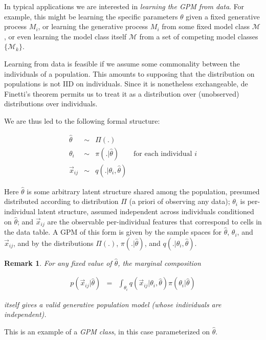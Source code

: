 \documentclass[10pt,letterpaper]{article}
\newtheorem{remark}{Remark}[section]
\newcommand{\set}[1]{\{#1\}}
\begin{document}
In typical applications we are interested in \textit{learning
the GPM from data}. For example, this might be learning the specific
parameters $\theta$ given a fixed generative process $M_i$, or learning the
generative process $M_i$ from some fixed model class $\mathcal{M}$, or even
learning the model class itself $\mathcal{M}$ from a set of competing model
classes $\set{\mathcal{M}_k}$.

Learning from data is feasible if we assume some commonality between
the individuals of a population.  This amounts to supposing that the
distribution on populations is not IID on individuals.  Since it
is nonetheless exchangeable, de Finetti's theorem 
permits us to treat it as a distribution over (unobserved) distributions
over individuals.

We are thus led to the following formal structure:

\begin{eqnarray*}
\hat{\theta} & \sim & \Pi(.) \\
\theta_i & \sim & \pi(.|\hat\theta) \qquad \textrm{for each individual $i$} \\
\vec{x}_{ij} & \sim & q(.|\theta_i, \hat\theta)
\end{eqnarray*}

Here $\hat\theta$ is some arbitrary latent structure shared among the
population, presumed distributed according to distribution $\Pi$ (a
priori of observing any data); $\theta_i$ is per-individual latent
structure, assumed independent across individuals conditioned on
$\hat\theta$; and $\vec{x}_{ij}$ are the observable per-individual
features that correspond to cells in the data table.  A GPM of this form is given by the
sample spaces for $\hat\theta$, $\theta_i$, and $\vec{x}_{ij}$, and by the
distributions $\Pi(.)$, $\pi(.|\hat\theta)$, and $q(.|\theta_i, \hat\theta)$.

\begin{remark}
For any fixed value of $\hat\theta$, the marginal composition

\begin{eqnarray}
 p(\vec{x}_{ij}|\hat\theta) & = &
 \int_{\theta_i} q(\vec{x}_{ij}|\theta_i, \hat\theta) \pi(\theta_i|\hat\theta)
 \label{eqn:marginal-individual}
\end{eqnarray}

itself gives a valid generative population model (whose individuals
are independent). \label{rem:gpm-class}
\end{remark}
This is an example of a \emph{GPM class}, in this
case parameterized on $\hat\theta$.
\end{document}
